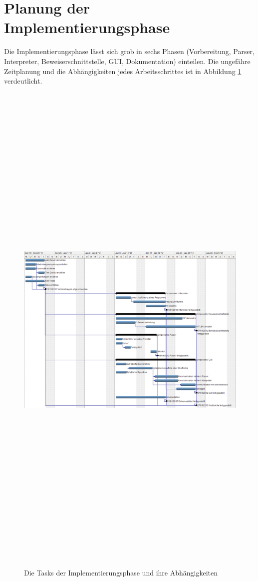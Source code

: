 \section{Planung der Implementierungsphase}

Die Implementierungsphase lässt sich grob in sechs Phasen (Vorbereitung, Parser, Interpreter, Beweiserschnittstelle, GUI, Dokumentation) einteilen. Die ungefähre Zeitplanung und die Abhängigkeiten jedes Arbeitsschrittes ist in Abbildung \ref{gantt_impl} verdeutlicht.

\begin{figure}
	\centering
	\hspace*{-2cm}\vspace*{-2cm}\caption[B]{Die Tasks der Implementierungsphase und ihre Abhängigkeiten}
	\hspace*{-3cm}\vspace*{-3cm}\includegraphics[angle=90,width=19cm,height= 25cm]{diagrams/gantt_implementierung_diag.png}
	
	\label{gantt_impl}
\end{figure}

